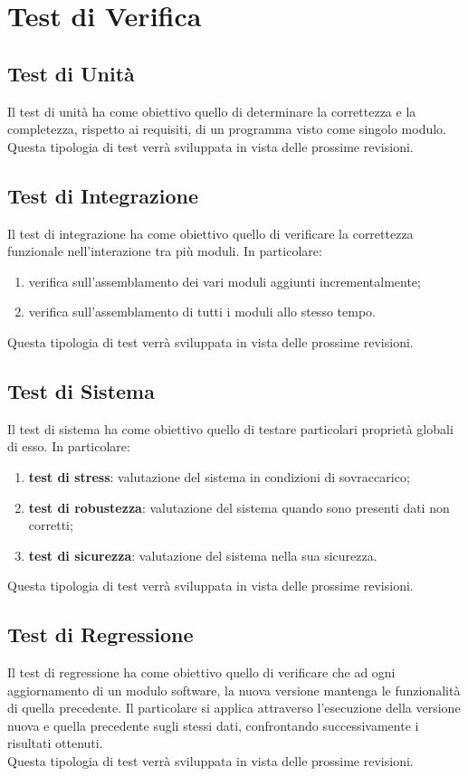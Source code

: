 \section{Test di Verifica}

\subsection{Test di Unità}
Il test di unità ha come obiettivo quello di determinare la correttezza e la completezza, rispetto ai requisiti, di un programma visto come singolo modulo.\\
Questa tipologia di test verrà sviluppata in vista delle prossime revisioni.


\subsection{Test di Integrazione}
Il test di integrazione ha come obiettivo quello di verificare la correttezza funzionale nell’interazione tra più moduli. In particolare:
\begin{enumerate}
	\item verifica sull'assemblamento dei vari moduli aggiunti incrementalmente;
	\item verifica sull'assemblamento di tutti i moduli allo stesso tempo.
\end{enumerate}
Questa tipologia di test verrà sviluppata in vista delle prossime revisioni.


\subsection{Test di Sistema}
Il test di sistema ha come obiettivo quello di testare particolari proprietà globali di esso. In particolare:
\begin{enumerate}
	\item \textbf{test di stress}: valutazione del sistema in condizioni di sovraccarico;
	\item \textbf{test di robustezza}: valutazione del sistema quando sono presenti dati non corretti;
	\item \textbf{test di sicurezza}: valutazione del sistema nella sua sicurezza.
\end{enumerate}
Questa tipologia di test verrà sviluppata in vista delle prossime revisioni.


\subsection{Test di Regressione}
Il test di regressione ha come obiettivo quello di verificare che ad ogni aggiornamento di un modulo software, la nuova versione mantenga le funzionalità di quella precedente.
Il particolare si applica attraverso l'esecuzione della versione nuova e quella precedente sugli stessi dati, confrontando successivamente i risultati ottenuti.\\
Questa tipologia di test verrà sviluppata in vista delle prossime revisioni.